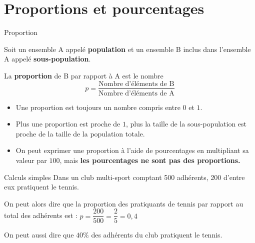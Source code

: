 \documentclass[oneside,12pt]{article}          %
\begin{document}
\section{Proportions et pourcentages}

\begin{rappel}{Proportion}
	\begin{minipage}{0.5\textwidth} \restoreskip
		Soit un ensemble A appelé \textbf{population} et un ensemble B inclus dans l'ensemble A appelé \textbf{sous-population}.
		
		La \textbf{proportion} de B par rapport à A est le nombre
		\[ p = \dfrac{\text{Nombre d'éléments de B}}{\text{Nombre d'éléments de A}} \]
	\end{minipage} \hspace{5mm}
	\begin{minipage}{0.45\textwidth}
	\end{minipage}
\end{rappel}

\begin{remarque}
	\begin{itemize}
		\item Une proportion est toujours un nombre compris entre $0$ et $1$.
		\item Plus une proportion est proche de $1$, plus la taille de la sous-population est proche de la taille de la population totale.
		\item On peut exprimer une proportion à l'aide de pourcentages en multipliant sa valeur par $100$, mais \textbf{les pourcentages ne sont pas des proportions.}
	\end{itemize}
\end{remarque}

\begin{exemple}{Calculs simples}
	Dans un club multi-sport comptant 500 adhérents, 200 d'entre eux pratiquent le tennis.
	
	On peut alors dire que la proportion des pratiquants de tennis par rapport au total des adhérents est : $p = \dfrac{200}{500} = \dfrac{2}{5} = 0,4$
	
	On peut aussi dire que $40\%$ des adhérents du club pratiquent le tennis.
\end{exemple}
\end{document}
